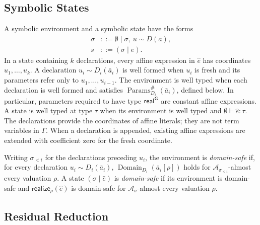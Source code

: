 \subsection{Symbolic States}

\begin{definition}
A symbolic environment and a symbolic state have the forms
\[
\begin{aligned}
  \sigma &::=\emptyset\mid\sigma,\ u\sim D(\bar a),\\
  s &::=(\sigma\mid\widehat e).
\end{aligned}
\]
In a state containing $k$ declarations, every affine expression in
$\widehat e$ has coordinates $u_1,\ldots,u_k$. A declaration
$u_i\sim D_i(\bar a_i)$ is well formed when $u_i$ is fresh and its
parameters refer only to $u_1,\ldots,u_{i-1}$. The environment is well typed
when each declaration is well formed and satisfies
$\operatorname{Params}^{\#}_{D_i}(\bar a_i)$, defined below.
In particular, parameters required to have type $\mathsf{real}^{\mathsf{G}}$ are constant
affine expressions.
A state is well typed at type $\tau$ when its environment is well typed
and $\emptyset\vdash\widehat e:\tau$. The declarations provide the
coordinates of affine literals; they are not term variables in $\Gamma$.
When a declaration is appended, existing affine expressions are extended
with coefficient zero for the fresh coordinate.

Writing $\sigma_{<i}$ for the declarations preceding $u_i$, the environment
is \emph{domain-safe} if, for every declaration $u_i\sim D_i(\bar a_i)$,
$\operatorname{Domain}_{D_i}(\bar a_i[\rho])$ holds for
$\mathcal A_{\sigma_{<i}}$-almost every valuation $\rho$.
A state $(\sigma\mid\widehat e)$ is \emph{domain-safe} if its environment
is domain-safe and $\mathsf{realize}_\rho(\widehat e)$ is domain-safe for
$\mathcal A_\sigma$-almost every valuation $\rho$.
\end{definition}

\subsection{Residual Reduction}
\label{sec:appendix-symbolic-rules}

